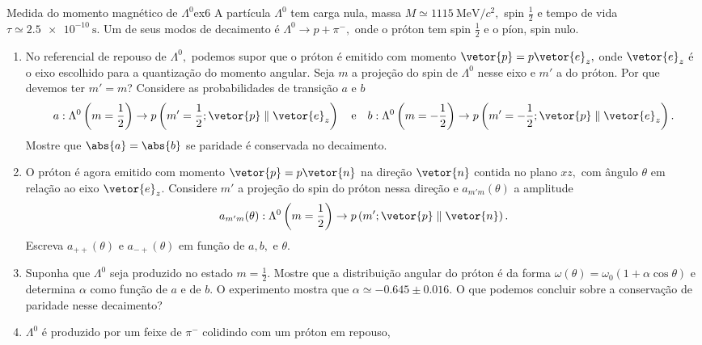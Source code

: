 \begin{exercício}{Medida do momento magnético de \(\Lambda^0\)}{ex6}
   A partícula \(\Lambda^0\) tem carga nula, massa \(M \simeq \SI{1115}{\mega\eV/c^2},\) spin \(\frac12\) e tempo de vida \(\tau \simeq \SI{2.5e-10}{\second}.\) Um de seus modos de decaimento é \(\Lambda^0 \to p + \pi^-,\) onde o próton tem spin \(\frac12\) e o píon, spin nulo.
   \begin{enumerate}[label=(\alph*)]
      \item No referencial de repouso de \(\Lambda^0,\) podemos supor que o próton é emitido com momento \(\vetor{p} = p \vetor{e}_z,\) onde \(\vetor{e}_z\) é o eixo escolhido para a quantização do momento angular. Seja \(m\) a projeção do spin de \(\Lambda^0\) nesse eixo e \(m'\) a do próton. Por que devemos ter \(m' = m\)? Considere as probabilidades de transição \(a\) e \(b\) 
         \begin{equation*}
            a: \Lambda^0\left(m = \frac12\right) \to p \left(m' = \frac12; \vetor{p} \parallel \vetor{e}_z\right)
            \quad\text{e}\quad
            b: \Lambda^0\left(m = -\frac12\right) \to p \left(m' = -\frac12; \vetor{p} \parallel \vetor{e}_z\right).
         \end{equation*}
         Mostre que \(\abs{a} = \abs{b}\) se paridade é conservada no decaimento. 
      \item O próton é agora emitido com momento \(\vetor{p} = p\vetor{n}\) na direção \(\vetor{n}\) contida no plano \(xz,\) com ângulo \(\theta\) em relação ao eixo \(\vetor{e}_z\). Considere \(m'\) a projeção do spin do próton nessa direção e \(a_{m'm}(\theta)\) a amplitude
         \begin{equation*}
            a_{m'm}(\theta) : \Lambda^0\left(m = \frac12\right) \to p \left(m'; \vetor{p} \parallel \vetor{n}\right).
         \end{equation*}
         Escreva \(a_{++}(\theta)\) e \(a_{-+}(\theta)\) em função de \(a, b,\) e \(\theta\).
      \item Suponha que \(\Lambda^0\) seja produzido no estado \(m = \frac12\). Mostre que a distribuição angular do próton é da forma \(\omega(\theta) = \omega_0 (1 + \alpha \cos\theta)\) e determina \(\alpha\) como função de \(a\) e de \(b.\) O experimento mostra que \(\alpha \simeq -0.645 \pm 0.016.\) O que podemos concluir sobre a conservação de paridade nesse decaimento?
      \item \(\Lambda^0\) é produzido por um feixe de \(\pi^-\) colidindo com um próton em repouso,

\end{enumerate}
\end{exercício}
